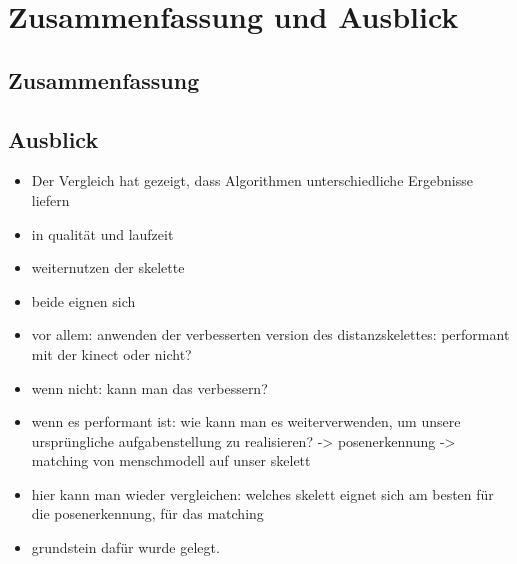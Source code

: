 \chapter{Zusammenfassung und Ausblick}
\section{Zusammenfassung}
\section{Ausblick}
\begin{itemize}
\item Der Vergleich hat gezeigt, dass Algorithmen unterschiedliche Ergebnisse liefern
\item in qualität und laufzeit
\item weiternutzen der skelette
\item beide eignen sich
\item vor allem: anwenden der verbesserten version des distanzskelettes: performant mit der kinect oder nicht?
\item wenn nicht: kann man das verbessern?
\item wenn es performant ist: wie kann man es weiterverwenden, um unsere ursprüngliche aufgabenstellung zu realisieren? -> posenerkennung -> matching von menschmodell auf unser skelett
\item hier kann man wieder vergleichen: welches skelett eignet sich am besten für die posenerkennung, für das matching
\item grundstein dafür wurde gelegt. 
\end{itemize}
